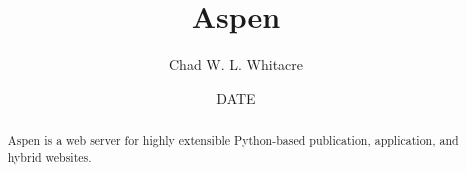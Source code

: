 \documentclass{manual}
\title{Aspen}
\author{Chad W. L. Whitacre}
\date{~~DATE~~} %
\begin{document}
\maketitle

\begin{abstract}

\noindent
Aspen is a web server for highly extensible Python-based publication,
application, and hybrid websites.

\end{abstract}





%
%

\end{document}
